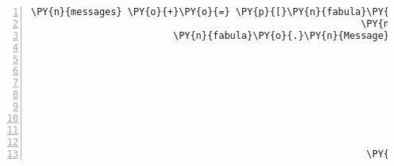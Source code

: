 \begin{Verbatim}[commandchars=\\\{\},numbers=left,firstnumber=1,stepnumber=1]
            \PY{n}{messages} \PY{o}{+}\PY{o}{=} \PY{p}{[}\PY{n}{fabula}\PY{o}{.}\PY{n}{Message}\PY{p}{(}\PY{p}{[}\PY{n}{fabula}\PY{o}{.}\PY{n}{SaysEvent}\PY{p}{(}\PY{n}{identifier}\PY{o}{=}\PY{l+s}{\PYZsq{}}\PY{l+s}{elf}\PY{l+s}{\PYZsq{}}\PY{p}{,}
                                                          \PY{n}{text}\PY{o}{=}\PY{l+s}{\PYZsq{}}\PY{l+s}{Oh du bist so gut zu mir, dafür schenke ich dir diese Saite!}\PY{l+s}{\PYZsq{}}\PY{p}{)}\PY{p}{]}\PY{p}{)}\PY{p}{,}
                         \PY{n}{fabula}\PY{o}{.}\PY{n}{Message}\PY{p}{(}\PY{p}{[}\PY{n}{fabula}\PY{o}{.}\PY{n}{SpawnEvent}\PY{p}{(}\PY{n}{fabula}\PY{o}{.}\PY{n}{Entity}\PY{p}{(}\PY{l+s}{\PYZsq{}}\PY{l+s}{string\PYZus{}harp}\PY{l+s}{\PYZsq{}}\PY{p}{,}
                                                                         \PY{n}{fabula}\PY{o}{.}\PY{n}{ITEM}\PY{p}{,}
                                                                         \PY{n+nb+bp}{True}\PY{p}{,}
                                                                         \PY{n+nb+bp}{True}\PY{p}{,}
                                                                         \PY{p}{\PYZob{}}\PY{l+s}{\PYZsq{}}\PY{l+s}{image/png}\PY{l+s}{\PYZsq{}}\PY{p}{:} \PY{n}{fabula}\PY{o}{.}\PY{n}{Asset}\PY{p}{(}\PY{n}{uri}\PY{o}{=}\PY{l+s}{\PYZsq{}}\PY{l+s}{string\PYZus{}harp.png}\PY{l+s}{\PYZsq{}}\PY{p}{,}
                                                                                                    \PY{n}{data}\PY{o}{=}\PY{n+nb+bp}{None}\PY{p}{)}\PY{p}{,}
                                                                          \PY{l+s}{\PYZsq{}}\PY{l+s}{audio/ogg}\PY{l+s}{\PYZsq{}}\PY{p}{:} \PY{n}{fabula}\PY{o}{.}\PY{n}{Asset}\PY{p}{(}\PY{n}{uri}\PY{o}{=}\PY{l+s}{\PYZsq{}}\PY{l+s}{string\PYZus{}harp.ogg}\PY{l+s}{\PYZsq{}}\PY{p}{,}
                                                                                                    \PY{n}{data}\PY{o}{=}\PY{n+nb+bp}{None}\PY{p}{)}\PY{p}{,}
                                                                          \PY{l+s}{\PYZsq{}}\PY{l+s}{text/plain}\PY{l+s}{\PYZsq{}}\PY{p}{:} \PY{n}{fabula}\PY{o}{.}\PY{n}{Asset}\PY{p}{(}\PY{n}{uri}\PY{o}{=}\PY{l+s}{\PYZsq{}}\PY{l+s}{string\PYZus{}harp.txt}\PY{l+s}{\PYZsq{}}\PY{p}{,}
                                                                                                     \PY{n}{data}\PY{o}{=}\PY{n+nb+bp}{None}\PY{p}{)}\PY{p}{\PYZcb{}}\PY{p}{)}\PY{p}{,}
                                                           \PY{n}{room}\PY{o}{.}\PY{n}{entity\PYZus{}locations}\PY{p}{[}\PY{l+s}{\PYZsq{}}\PY{l+s}{elf}\PY{l+s}{\PYZsq{}}\PY{p}{]} \PY{o}{+} \PY{p}{(}\PY{n}{room}\PY{o}{.}\PY{n}{identifier}\PY{p}{,}\PY{p}{)}\PY{p}{)}\PY{p}{]}\PY{p}{)}\PY{p}{,}

\end{Verbatim}

